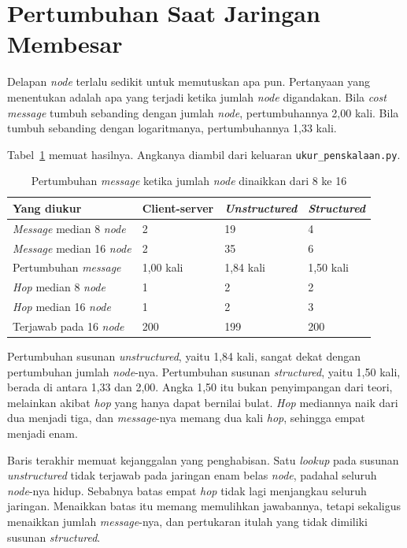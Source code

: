 \section{Pertumbuhan Saat Jaringan Membesar}

Delapan \textit{node} terlalu sedikit untuk memutuskan apa pun. Pertanyaan yang
menentukan adalah apa yang terjadi ketika jumlah \textit{node} digandakan. Bila \textit{cost}
\textit{message} tumbuh sebanding dengan jumlah \textit{node}, pertumbuhannya 2,00 kali. Bila
tumbuh sebanding dengan logaritmanya, pertumbuhannya 1,33 kali.

Tabel~\ref{tab:penskalaan-p2p} memuat hasilnya. Angkanya diambil dari keluaran
\texttt{ukur\_penskalaan.py}.

\begin{table}[htbp]
  \centering
  \caption{Pertumbuhan \textit{message} ketika jumlah \textit{node} dinaikkan dari 8 ke 16}
  \label{tab:penskalaan-p2p}
  \begin{tabularx}{\textwidth}{|X|l|l|l|}
    \hline
    \textbf{Yang diukur} & \textbf{Client-server} & \textbf{\textit{Unstructured}} & \textbf{\textit{Structured}} \\
    \hline
    \textit{Message} median 8 \textit{node} & 2 & 19 & 4 \\
    \hline
    \textit{Message} median 16 \textit{node} & 2 & 35 & 6 \\
    \hline
    Pertumbuhan \textit{message} & 1,00 kali & 1,84 kali & 1,50 kali \\
    \hline
    \textit{Hop} median 8 \textit{node} & 1 & 2 & 2 \\
    \hline
    \textit{Hop} median 16 \textit{node} & 1 & 2 & 3 \\
    \hline
    Terjawab pada 16 \textit{node} & 200 & 199 & 200 \\
    \hline
  \end{tabularx}
\end{table}

Pertumbuhan susunan \textit{unstructured}, yaitu 1,84 kali, sangat dekat dengan
pertumbuhan jumlah \textit{node}-nya. Pertumbuhan susunan \textit{structured}, yaitu 1,50 kali,
berada di antara 1,33 dan 2,00. Angka 1,50 itu bukan penyimpangan dari teori,
melainkan akibat \textit{hop} yang hanya dapat bernilai bulat. \textit{Hop} mediannya
naik dari dua menjadi tiga, dan \textit{message}-nya memang dua kali \textit{hop}, sehingga
empat menjadi enam.

Baris terakhir memuat kejanggalan yang penghabisan. Satu \textit{lookup} pada susunan
\textit{unstructured} tidak terjawab pada jaringan enam belas \textit{node}, padahal seluruh
\textit{node}-nya hidup. Sebabnya batas empat \textit{hop} tidak lagi menjangkau seluruh
jaringan. Menaikkan batas itu memang memulihkan jawabannya, tetapi sekaligus
menaikkan jumlah \textit{message}-nya, dan pertukaran itulah yang tidak dimiliki susunan
\textit{structured}.

